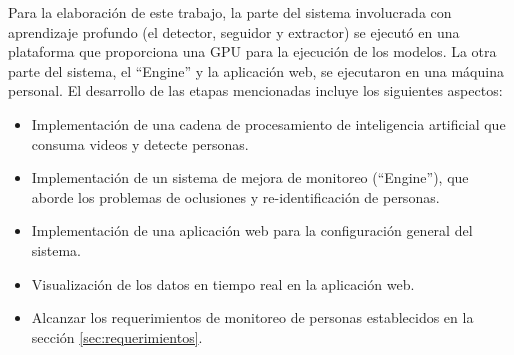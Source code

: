 Para la elaboración de este trabajo, la parte del sistema involucrada con aprendizaje profundo (el detector, seguidor y extractor) se ejecutó en una plataforma que proporciona una GPU para la ejecución de los modelos. La otra parte del sistema, el ``Engine'' y la aplicación web, se ejecutaron en una máquina personal. El desarrollo de las etapas mencionadas incluye los siguientes aspectos:
\begin{itemize}
\item Implementación de una cadena de procesamiento de inteligencia artificial que consuma videos  y detecte personas.
\item Implementación de un sistema de mejora de monitoreo (``Engine''), que aborde los problemas de oclusiones y re-identificación de personas.
\item Implementación de una aplicación web para la configuración general del sistema.
\item Visualización de los datos en tiempo real en la aplicación web.
\item Alcanzar los requerimientos de monitoreo de personas establecidos en la sección \ref{sec:requerimientos}.
\end{itemize}


